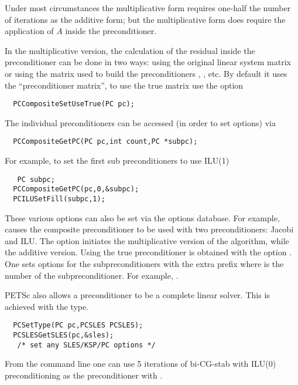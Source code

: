 Under most circumstances the multiplicative form requires one-half the number of
iterations as the additive form; but the multiplicative form does require 
the application of $ A $ inside the preconditioner. 

In the multiplicative version, the calculation of the residual inside the 
preconditioner can be done in two ways: using the original linear system matrix
or using the matrix used to build the preconditioners , , etc.
By default it uses the ``preconditioner matrix'', to use the true matrix use the 
option 
\begin{verbatim}
  PCCompositeSetUseTrue(PC pc);
\end{verbatim}

The individual 
preconditioners can be accessed (in order to set options) via
\begin{verbatim}
  PCCompositeGetPC(PC pc,int count,PC *subpc);
\end{verbatim}
For example, to set the first sub preconditioners to use ILU(1)
\begin{verbatim}
   PC subpc;
  PCCompositeGetPC(pc,0,&subpc);
  PCILUSetFill(subpc,1);
\end{verbatim}

These various options can also be set via the options database. For example,
  
 causes the composite preconditioner to be used with 
two preconditioners: Jacobi and ILU. The option 
 initiates the multiplicative version of the algorithm,
while  the additive version. Using the true
preconditioner is obtained with the option . 
 One sets options for the subpreconditioners with the 
extra prefix  where  is the number of the subpreconditioner.
For example, .


PETSc also allows a preconditioner to be a complete linear solver. This is 
achieved with the  type. 
\begin{verbatim}
  PCSetType(PC pc,PCSLES PCSLES);
  PCSLESGetSLES(pc,&sles);
   /* set any SLES/KSP/PC options */
\end{verbatim}
 From the command line one can use 5 iterations of 
bi-CG-stab with ILU(0) preconditioning as the preconditioner with 
. 

